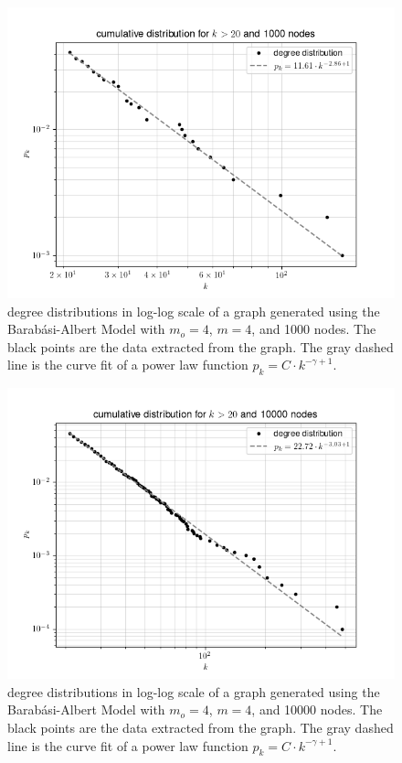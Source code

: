 \documentclass{article}
\newcommand{\scaleFreeFunction}{\ensuremath{p_k = C \cdot k^{-\gamma + 1}}}
\newcommand{\netDescription}[1]{degree distributions in log-log scale of a graph generated using the Barabási-Albert Model with $m_o = 4$, $m = 4$, and #1 nodes. The black points are the data extracted from the graph. The gray dashed line is the curve fit of a power law function \scaleFreeFunction.}
\begin{document}
\begin{figure}[!ht]
    \centering
    \includegraphics[width=\textwidth]{../result/large_degrees/1000.png}
    \caption{\netDescription{1000}}
    \label{figure:large-1000}
\end{figure}

\begin{figure}[!ht]
    \centering
    \includegraphics[width=\textwidth]{../result/large_degrees/10000.png}
    \caption{\netDescription{10000}}
    \label{figure:large-10000}
\end{figure}
\end{document}
